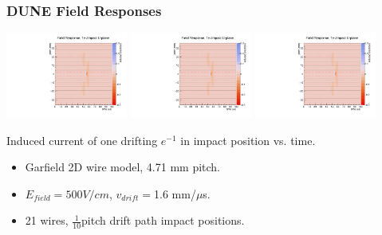 \documentclass[xcolor=dvipsnames]{beamer}
\begin{document}
\begin{frame}
  \frametitle{DUNE Field Responses}
  \begin{center}
    \includegraphics[width=0.3\textwidth,page=1]{test_impactresponse.pdf}
    \includegraphics[width=0.3\textwidth,page=5]{test_impactresponse.pdf}
    \includegraphics[width=0.3\textwidth,page=9]{test_impactresponse.pdf}

    \scriptsize
    Induced current of one drifting $e^{-1}$ in impact position vs. time.
  \end{center}
  
  \begin{itemize}
  \item Garfield 2D wire model, 4.71 mm pitch.
  \item $E_{field} = 500 V/cm$, $v_{drift} = $1.6 mm/$\mu$s.
  \item 21 wires, $\frac{1}{10}$pitch drift path impact positions.
  \end{itemize}
\end{frame}
\end{document}
